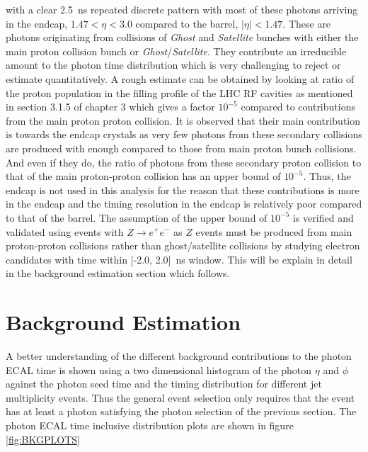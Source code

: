  with a clear 2.5~ns repeated discrete pattern with most of these photons arriving in the endcap, $ 1.47 < \eta < 3.0$ compared to the barrel, $|\eta| < 1.47$. These are photons originating from collisions of \textit{Ghost} and \textit{Satellite} bunches with either the main proton collision bunch or \textit{Ghost}/\textit{Satellite}. They contribute an irreducible amount to the photon time distribution which is very challenging to reject or estimate quantitatively. A rough estimate can be obtained by looking at ratio of the proton population in the filling profile of the LHC RF cavities as mentioned in section 3.1.5 of chapter 3 which gives a factor $10^{-5}$ compared to contributions from the main proton proton collision. It is observed that their main contribution is towards the endcap crystals as very few photons from these secondary collisions are produced with enough \pt compared to those from main proton bunch collisions. And even if they do, the ratio of photons from these secondary proton collision to that of the main proton-proton collision has an upper bound of  $10^{-5}$. 
Thus, the endcap is not used in this analysis for the reason that these contributions is more in the endcap and the timing resolution in the endcap is relatively poor compared to that of the barrel.
The assumption of the upper bound of $10^{-5}$ is verified and validated using events with $Z\rightarrow e^{+}e^{-}$ as $Z$ events must be produced from main proton-proton collisions rather than  ghost/satellite collisions by studying electron candidates with time within [-2.0, 2.0]~ns window. This will be explain in detail in the background estimation section which follows.


\section{Background Estimation}
A better understanding of the different background contributions to the photon ECAL time is shown using a two dimensional histogram of the photon $\eta$ and $\phi$ against the photon seed time and the timing distribution for different jet multiplicity events. Thus the general event selection only requires that the event has at least a photon satisfying the photon selection of the previous section.
The photon ECAL time inclusive distribution plots are shown in figure \ref{fig:BKGPLOTS}

